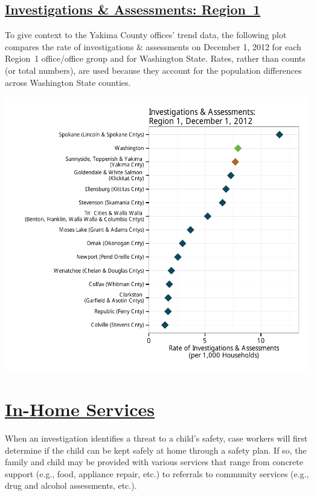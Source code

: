 \documentclass{article}\usepackage[]{graphicx}\usepackage[]{color}
\makeatletter
\def\maxwidth{ %
  \ifdim\Gin@nat@width>\linewidth
    \linewidth
  \else
    \Gin@nat@width
  \fi
}
\newenvironment{knitrout}{}{} %
\makeatother
\begin{document}
\subsection{
    \href{http://www.partnersforourchildren.org//child-well-being/visualizations/investigations-assessments/trends}
    {Investigations \& Assessments: Region~1}}
To give context to the Yakima County offices' trend data, the following plot compares the rate of investigations \& assessments on December 1, 2012 for each Region~1 office/office group and for Washington State.  Rates, rather than counts (or total numbers), are used because they account for the population differences across Washington State counties.
\nopagebreak[3]
\begin{knitrout}
\color{fgcolor}

{\centering \includegraphics[width=\maxwidth]{figure/ia_context} 

}



\end{knitrout}



\newpage
\section{\href{http://www.partnersforourchildren.org/child-well-being/visualizations/home-services/trends}
    {In-Home Services}
}
When an investigation identifies a threat to a child's safety, case workers will first determine if the child can be kept safely at home through a safety plan. If so, the family and child may be provided with various services that range from concrete support (e.g., food, appliance repair, etc.) to referrals to community services (e.g., drug and alcohol assessments, etc.).\\[6pt]
\label{p:ihs}
\end{document}
